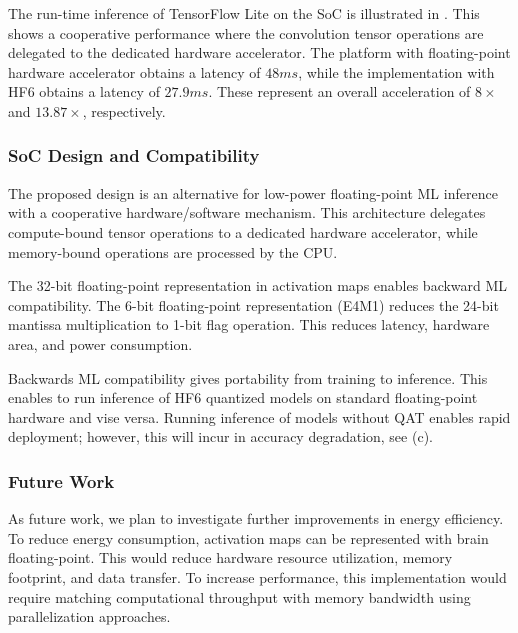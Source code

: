 The run-time inference of TensorFlow Lite on the SoC is illustrated in . This shows a cooperative performance where the convolution tensor operations are delegated to the dedicated hardware accelerator. The platform with floating-point hardware accelerator obtains a latency of $48 ms$, while the implementation with HF6 obtains a latency of $27.9 ms$. These represent an overall acceleration of $8\times$ and $13.87\times$, respectively.

\subsubsection{SoC Design and Compatibility}
The proposed design is an alternative for low-power floating-point ML inference with a cooperative hardware/software mechanism. This architecture delegates compute-bound tensor operations to a dedicated hardware accelerator, while memory-bound operations are processed by the CPU.

The 32-bit floating-point representation in activation maps enables backward ML compatibility. The 6-bit floating-point representation (E4M1) reduces the 24-bit mantissa multiplication to 1-bit flag operation. This reduces latency, hardware area, and power consumption.

Backwards ML compatibility gives portability from training to inference. This enables to run inference of HF6 quantized models on standard floating-point hardware and vise versa. Running inference of models without QAT enables rapid deployment; however, this will incur in accuracy degradation, see (c).

\subsubsection{Future Work}
As future work, we plan to investigate further improvements in energy efficiency. To reduce energy consumption, activation maps can be represented with brain floating-point. This would reduce hardware resource utilization, memory footprint, and data transfer. To increase performance, this implementation would require matching computational throughput with memory bandwidth using parallelization approaches.